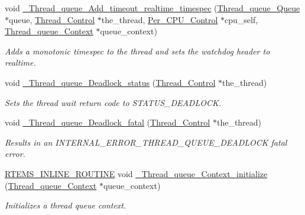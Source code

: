 \begin{DoxyCompactItemize}
void \mbox{\hyperlink{group__RTEMSScoreThreadQueue_ga14552dcef85b4627e1b2d150f7245f81}{\+\_\+\+Thread\+\_\+queue\+\_\+\+Add\+\_\+timeout\+\_\+realtime\+\_\+timespec}} (\mbox{\hyperlink{structThread__queue__Queue}{Thread\+\_\+queue\+\_\+\+Queue}} $\ast$queue, \mbox{\hyperlink{struct__Thread__Control}{Thread\+\_\+\+Control}} $\ast$the\+\_\+thread, \mbox{\hyperlink{structPer__CPU__Control}{Per\+\_\+\+C\+P\+U\+\_\+\+Control}} $\ast$cpu\+\_\+self, \mbox{\hyperlink{structThread__queue__Context}{Thread\+\_\+queue\+\_\+\+Context}} $\ast$queue\+\_\+context)
\begin{DoxyCompactList}\small\item\em Adds a monotonic timespec to the thread and sets the watchdog header to realtime. \end{DoxyCompactList}\item 
void \mbox{\hyperlink{group__RTEMSScoreThreadQueue_gaca11db0fbad98d6b0ee9a41139aa7d54}{\+\_\+\+Thread\+\_\+queue\+\_\+\+Deadlock\+\_\+status}} (\mbox{\hyperlink{struct__Thread__Control}{Thread\+\_\+\+Control}} $\ast$the\+\_\+thread)
\begin{DoxyCompactList}\small\item\em Sets the thread wait return code to S\+T\+A\+T\+U\+S\+\_\+\+D\+E\+A\+D\+L\+O\+CK. \end{DoxyCompactList}\item 
void \mbox{\hyperlink{group__RTEMSScoreThreadQueue_ga673681292c0f047b02c6dbb6819e0ad7}{\+\_\+\+Thread\+\_\+queue\+\_\+\+Deadlock\+\_\+fatal}} (\mbox{\hyperlink{struct__Thread__Control}{Thread\+\_\+\+Control}} $\ast$the\+\_\+thread)
\begin{DoxyCompactList}\small\item\em Results in an I\+N\+T\+E\+R\+N\+A\+L\+\_\+\+E\+R\+R\+O\+R\+\_\+\+T\+H\+R\+E\+A\+D\+\_\+\+Q\+U\+E\+U\+E\+\_\+\+D\+E\+A\+D\+L\+O\+CK fatal error. \end{DoxyCompactList}\item 
\mbox{\hyperlink{group__RTEMSScoreBaseDefs_gac216239df231d5dbd15e3520b0b9313f}{R\+T\+E\+M\+S\+\_\+\+I\+N\+L\+I\+N\+E\+\_\+\+R\+O\+U\+T\+I\+NE}} void \mbox{\hyperlink{group__RTEMSScoreThreadQueue_gae18ee06777084a67d286d743355d47ac}{\+\_\+\+Thread\+\_\+queue\+\_\+\+Context\+\_\+initialize}} (\mbox{\hyperlink{structThread__queue__Context}{Thread\+\_\+queue\+\_\+\+Context}} $\ast$queue\+\_\+context)
\begin{DoxyCompactList}\small\item\em Initializes a thread queue context. \end{DoxyCompactList}\item 

\end{DoxyCompactItemize}
